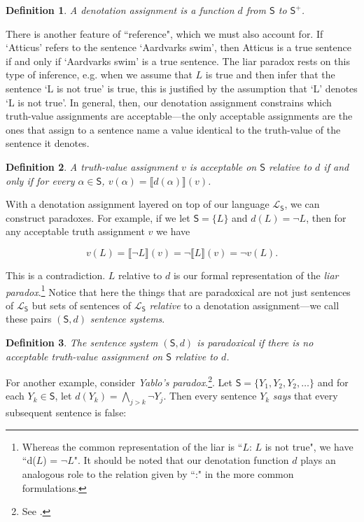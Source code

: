 \documentclass[12pt]{kluwer}
\newtheorem{defn}{Definition}
\theoremstyle{remark}
\newcommand{\fancy}[1]{\mathcal{#1}}
\def\S{\textsf{S}}
\def\L{\fancy{L}}
\begin{document}
\begin{defn}
 A denotation assignment is a function $d$ from $\S$ to $\S^+$. 
\end{defn}

There is another feature of ``reference", which we must also account for. If `Atticus' refers to the sentence `Aardvarks swim', then Atticus is a true sentence if and only if `Aardvarks swim' is a true sentence. The liar paradox rests on this type of inference, e.g. when we assume that $L$ is true and then infer that the sentence `L is not true' is true, this is justified by the assumption that  `L' denotes `L is not true'. In general, then, our denotation assignment constrains which truth-value assignments are acceptable---the only acceptable assignments are the ones that assign to a sentence name a value identical to the truth-value of the sentence it denotes.

 \begin{defn} A truth-value assignment $v$ is acceptable on $\S$ relative to $d$ if and only if for every $\alpha \in \S$, $v(\alpha) = \llbracket d(\alpha) \rrbracket(v)$.
\end{defn}

With a denotation assignment layered on top of our language $\L_\S$, we can construct paradoxes. For example, if we let $\S = \{L\}$ and $d(L) = \neg L$, then for any acceptable truth assignment $v$ we have
 
\[v(L) = \llbracket \neg L \rrbracket(v) = \neg \llbracket L \rrbracket(v) = \neg v(L).\]
 
This is a contradiction. $L$ relative to $d$ is our formal representation of the \textit{liar paradox}.\footnote{Whereas the common representation of the liar is ``$L$: $L$ is not true", we have ``d($L$) = $\neg L$". It should be noted that our denotation function $d$ plays an analogous role to the relation given by ``:" in the more common formulations.} Notice that here the things that are paradoxical are not just sentences of $\L_\S$ but sets of sentences of $\L_\S$ \textit{relative} to a denotation assignment---we call these pairs $(\S, d)$ \textit{sentence systems}.

\begin{defn}
The sentence system $(\S, d)$ is \emph{paradoxical} if there is no acceptable truth-value assignment on $\S$ relative to $d$.
\end{defn}


For another example, consider \textit{Yablo's paradox}.\footnote{See \cite{yablo93}.}. Let $\S = \{Y_1, Y_2, Y_2, \dots\}$ and for each $Y_k \in \S$, let $d(Y_k) = \bigwedge_{j > k} \neg Y_j$. Then every sentence $Y_k$ \textit{says} that every subsequent sentence is false:
\end{document}
